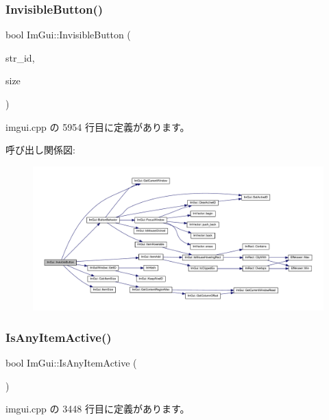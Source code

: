 \subsubsection{\texorpdfstring{Invisible\+Button()}{InvisibleButton()}}
{\footnotesize\ttfamily bool Im\+Gui\+::\+Invisible\+Button (\begin{DoxyParamCaption}\item[{const char $\ast$}]{str\+\_\+id,  }\item[{const \mbox{\hyperlink{struct_im_vec2}{Im\+Vec2}} \&}]{size }\end{DoxyParamCaption})}



 imgui.\+cpp の 5954 行目に定義があります。

呼び出し関係図\+:\nopagebreak
\begin{figure}[H]
\begin{center}
\leavevmode
\includegraphics[width=350pt]{namespace_im_gui_a22668d440cbbb1f8be07241d9c6d9096_cgraph}
\end{center}
\end{figure}
\mbox{\label{namespace_im_gui_acdc18199d50d26919312db5f9707b8dc}} 
\subsubsection{\texorpdfstring{Is\+Any\+Item\+Active()}{IsAnyItemActive()}}
{\footnotesize\ttfamily bool Im\+Gui\+::\+Is\+Any\+Item\+Active (\begin{DoxyParamCaption}{ }\end{DoxyParamCaption})}



 imgui.\+cpp の 3448 行目に定義があります。

